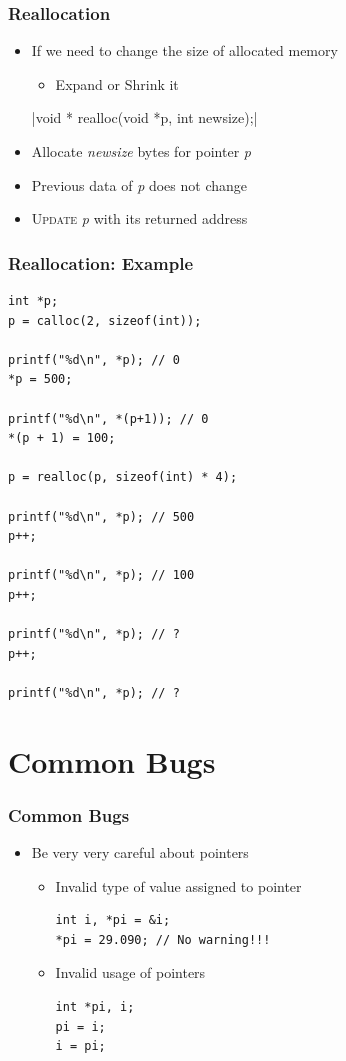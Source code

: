 \documentclass{../c-lecture}
\begin{document}
\begin{frame}
  \frametitle{Reallocation}
  \begin{itemize}
    \item If we need to change the size of allocated memory
    \begin{itemize}
      \item Expand or Shrink it
    \end{itemize}
    |void * realloc(void *p, int newsize);|
    \item
      Allocate \textit{\color{YellowOrange} newsize} bytes for pointer
      \textit{\color{LimeGreen} p}

    \item Previous data of \textit{\color{LimeGreen} p} does not change
    \item
      \textsc{\color{RubineRed} Update} \textit{\color{LimeGreen} p} with
      its returned address
  \end{itemize}
\end{frame}

\begin{frame}[fragile]
  \frametitle{Reallocation: Example}
  \scriptsize
  \begin{verbatim}
int *p;
p = calloc(2, sizeof(int));

printf("%d\n", *p); // 0
*p = 500;

printf("%d\n", *(p+1)); // 0
*(p + 1) = 100;

p = realloc(p, sizeof(int) * 4);

printf("%d\n", *p); // 500
p++;

printf("%d\n", *p); // 100
p++;

printf("%d\n", *p); // ?
p++;

printf("%d\n", *p); // ?
  \end{verbatim}
\end{frame}

\section{Common Bugs}

\begin{frame}[fragile]
  \frametitle{Common Bugs}
  \begin{itemize}
    \item
      Be {\color{Orange} very very} careful about pointers
    \begin{itemize}
      \item Invalid type of value assigned to pointer
      \begin{verbatim}
int i, *pi = &i;
*pi = 29.090; // No warning!!!
      \end{verbatim}
      \item Invalid usage of pointers
      \begin{verbatim}
int *pi, i;
pi = i;
i = pi;
      \end{verbatim}
    \end{itemize}
  \end{itemize}
\end{frame}
\end{document}
